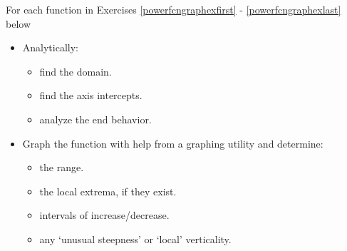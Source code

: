 \documentclass{ximera}
\begin{document}
For each function in Exercises \ref{powerfcngraphexfirst} - \ref{powerfcngraphexlast} below 

\begin{itemize}

\item Analytically:

\begin{multicols}{3}

\begin{itemize}

\item find the domain.

\item find the axis intercepts.

\item analyze the end behavior.

\end{itemize}

\end{multicols}

\item Graph the function with help from a graphing utility and determine:

\begin{multicols}{2}

\begin{itemize}

\item  the range.

\item the local extrema, if they exist.

\end{itemize}

\end{multicols}

\begin{multicols}{2}

\begin{itemize}

\item intervals of increase/decrease.

\item any `unusual steepness' or `local' verticality.

\end{itemize}

\end{multicols}

\begin{multicols}{2}

\begin{itemize}


\end{itemize}
\end{multicols}
\end{itemize}
\end{document}
